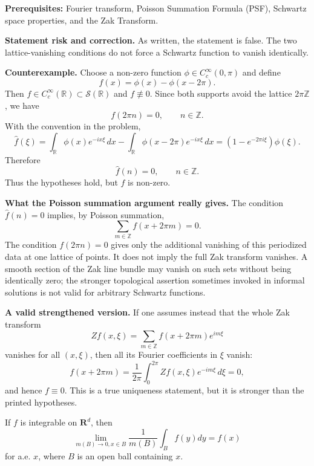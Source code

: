 \begin{solution}
\textbf{Prerequisites:} 
Fourier transform, Poisson Summation Formula (PSF), Schwartz space properties, and the Zak Transform.

\par\vspace{\baselineskip}
\textbf{Statement risk and correction.}
As written, the statement is false.  The two lattice-vanishing conditions do not force a Schwartz function to vanish identically.

\par\vspace{\baselineskip}
\textbf{Counterexample.}
Choose a non-zero function $\phi\in C_c^\infty(0,\pi)$ and define
\[
f(x)=\phi(x)-\phi(x-2\pi).
\]
Then $f\in C_c^\infty(\mathbb{R})\subset\mathcal{S}(\mathbb{R})$ and $f\not\equiv0$.  Since both supports avoid the lattice $2\pi\mathbb{Z}$, we have
\[
f(2\pi n)=0,\qquad n\in\mathbb{Z}.
\]
With the convention in the problem,
\[
\hat f(\xi)
=\int_{\mathbb{R}}\phi(x)e^{-ix\xi}\,dx
-\int_{\mathbb{R}}\phi(x-2\pi)e^{-ix\xi}\,dx
=\left(1-e^{-2\pi i\xi}\right)\hat\phi(\xi).
\]
Therefore
\[
\hat f(n)=0,\qquad n\in\mathbb{Z}.
\]
Thus the hypotheses hold, but $f$ is non-zero.

\par\vspace{\baselineskip}
\textbf{What the Poisson summation argument really gives.}
The condition $\hat f(n)=0$ implies, by Poisson summation,
\[
\sum_{m\in\mathbb{Z}} f(x+2\pi m)=0.
\]
The condition $f(2\pi n)=0$ gives only the additional vanishing of this periodized data at one lattice of points.  It does not imply the full Zak transform vanishes.  A smooth section of the Zak line bundle may vanish on such sets without being identically zero; the stronger topological assertion sometimes invoked in informal solutions is not valid for arbitrary Schwartz functions.

\par\vspace{\baselineskip}
\textbf{A valid strengthened version.}
If one assumes instead that the whole Zak transform
\[
Zf(x,\xi)=\sum_{m\in\mathbb{Z}}f(x+2\pi m)e^{im\xi}
\]
vanishes for all $(x,\xi)$, then all its Fourier coefficients in $\xi$ vanish:
\[
f(x+2\pi m)=\frac{1}{2\pi}\int_0^{2\pi}Zf(x,\xi)e^{-im\xi}\,d\xi=0,
\]
and hence $f\equiv0$.  This is a true uniqueness statement, but it is stronger than the printed hypotheses.
\end{solution}

\begin{exercise}
\label{analysis:2018:9}
If $f$ is integrable on $\mathbf{R}^d$, then
\[
\lim_{m(B) \to 0, x \in B} \frac{1}{m(B)} \int_B f(y) dy = f(x)
\]
for a.e. $x$, where $B$ is an open ball containing $x$.
\end{exercise}

